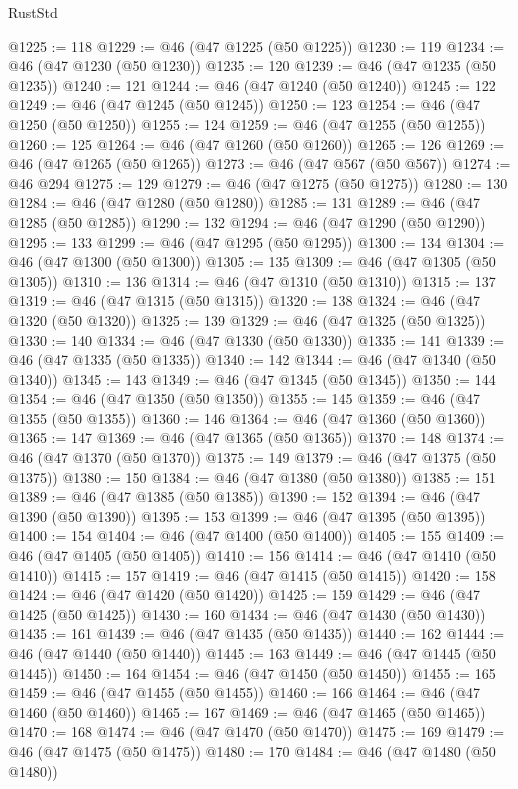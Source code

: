 \begin{lexlean}{RustStd}
\begin{coremodule}
{\begin{coremodule}
{{{{{{{{{{{{{{@1225 := 118
@1229 := @46 (@47 @1225 (@50 @1225))
@1230 := 119
@1234 := @46 (@47 @1230 (@50 @1230))
@1235 := 120
@1239 := @46 (@47 @1235 (@50 @1235))
@1240 := 121
@1244 := @46 (@47 @1240 (@50 @1240))
@1245 := 122
@1249 := @46 (@47 @1245 (@50 @1245))
@1250 := 123
@1254 := @46 (@47 @1250 (@50 @1250))
@1255 := 124
@1259 := @46 (@47 @1255 (@50 @1255))
@1260 := 125
@1264 := @46 (@47 @1260 (@50 @1260))
@1265 := 126
@1269 := @46 (@47 @1265 (@50 @1265))
@1273 := @46 (@47 @567 (@50 @567))
@1274 := @46 @294
@1275 := 129
@1279 := @46 (@47 @1275 (@50 @1275))
@1280 := 130
@1284 := @46 (@47 @1280 (@50 @1280))
@1285 := 131
@1289 := @46 (@47 @1285 (@50 @1285))
@1290 := 132
@1294 := @46 (@47 @1290 (@50 @1290))
@1295 := 133
@1299 := @46 (@47 @1295 (@50 @1295))
@1300 := 134
@1304 := @46 (@47 @1300 (@50 @1300))
@1305 := 135
@1309 := @46 (@47 @1305 (@50 @1305))
@1310 := 136
@1314 := @46 (@47 @1310 (@50 @1310))
@1315 := 137
@1319 := @46 (@47 @1315 (@50 @1315))
@1320 := 138
@1324 := @46 (@47 @1320 (@50 @1320))
@1325 := 139
@1329 := @46 (@47 @1325 (@50 @1325))
@1330 := 140
@1334 := @46 (@47 @1330 (@50 @1330))
@1335 := 141
@1339 := @46 (@47 @1335 (@50 @1335))
@1340 := 142
@1344 := @46 (@47 @1340 (@50 @1340))
@1345 := 143
@1349 := @46 (@47 @1345 (@50 @1345))
@1350 := 144
@1354 := @46 (@47 @1350 (@50 @1350))
@1355 := 145
@1359 := @46 (@47 @1355 (@50 @1355))
@1360 := 146
@1364 := @46 (@47 @1360 (@50 @1360))
@1365 := 147
@1369 := @46 (@47 @1365 (@50 @1365))
@1370 := 148
@1374 := @46 (@47 @1370 (@50 @1370))
@1375 := 149
@1379 := @46 (@47 @1375 (@50 @1375))
@1380 := 150
@1384 := @46 (@47 @1380 (@50 @1380))
@1385 := 151
@1389 := @46 (@47 @1385 (@50 @1385))
@1390 := 152
@1394 := @46 (@47 @1390 (@50 @1390))
@1395 := 153
@1399 := @46 (@47 @1395 (@50 @1395))
@1400 := 154
@1404 := @46 (@47 @1400 (@50 @1400))
@1405 := 155
@1409 := @46 (@47 @1405 (@50 @1405))
@1410 := 156
@1414 := @46 (@47 @1410 (@50 @1410))
@1415 := 157
@1419 := @46 (@47 @1415 (@50 @1415))
@1420 := 158
@1424 := @46 (@47 @1420 (@50 @1420))
@1425 := 159
@1429 := @46 (@47 @1425 (@50 @1425))
@1430 := 160
@1434 := @46 (@47 @1430 (@50 @1430))
@1435 := 161
@1439 := @46 (@47 @1435 (@50 @1435))
@1440 := 162
@1444 := @46 (@47 @1440 (@50 @1440))
@1445 := 163
@1449 := @46 (@47 @1445 (@50 @1445))
@1450 := 164
@1454 := @46 (@47 @1450 (@50 @1450))
@1455 := 165
@1459 := @46 (@47 @1455 (@50 @1455))
@1460 := 166
@1464 := @46 (@47 @1460 (@50 @1460))
@1465 := 167
@1469 := @46 (@47 @1465 (@50 @1465))
@1470 := 168
@1474 := @46 (@47 @1470 (@50 @1470))
@1475 := 169
@1479 := @46 (@47 @1475 (@50 @1475))
@1480 := 170
@1484 := @46 (@47 @1480 (@50 @1480))
}}}}}}}}}}}}}}
\end{coremodule}}
\end{coremodule}
\end{lexlean}
